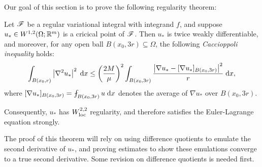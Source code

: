 Our goal of this section is to prove the following regularity theorem:
\begin{theorem}
    Let $\mathscr{F}$ be a regular variational integral with integrand $f$, and suppose $u_* \in W^{1,2}(\Omega;\mathbb{R}^m)$ is a cricical point of $\mathscr{F}$. Then $u_*$ is twice weakly differentiable, and moreover, for any open ball $B(x_0,3r) \subseteq \Omega$, the following \textit{Caccioppoli inequality} holds:
    \begin{equation}
        \int_{B(x_0,r)} \left\lvert {\nabla^2 u_*} \right\rvert^2 \; \mathrm{d} x \leq \left( {\frac{2M}{\mu}} \right)^2 \int_{B(x_0,3r)} \frac{\left\lvert {\nabla u_* - [\nabla u_*]_{B(x_0,3r)}} \right\rvert^2}{r} \; \mathrm{d} x,
    \end{equation}
    where $[\nabla u_*]_{B(x_0,3r)} = \fint_{B(x_0,3r)} u \; \d x$ denotes the average of $\nabla u_*$ over $B(x_0,3r)$.

    Consequently, $u_*$ has $W^{2,2}_{\rm loc}$ regularity, and therefore satisfies the Euler-Lagrange equation strongly.
\end{theorem}
The proof of this theorem will rely on using difference quotients to emulate the second derivative of $u_*$, and proving estimates to show these emulations converge to a true second derivative. Some revision on difference quotients is needed first. 

